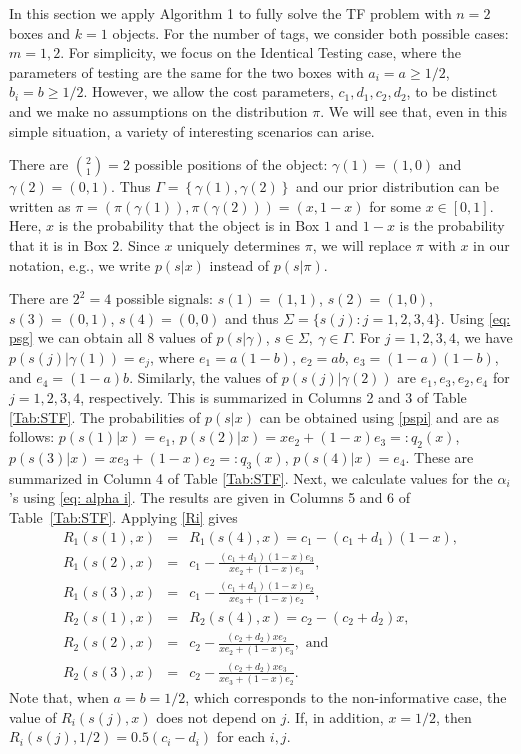 \documentclass[a4paper,11pt]{article}
\begin{document}
In this section we apply Algorithm 1 to fully solve the TF problem with $n=2$ boxes and $k=1$ objects. For the number of tags, we consider both possible cases: $m=1,2$.  For simplicity, we focus on the Identical Testing case, where the parameters of testing are the same for the two boxes with $a_i=a\ge1/2$, $b_i=b\ge1/2$. However, we allow the cost parameters, $c_1,d_1, c_2,d_2$, to be distinct and we make no assumptions on the distribution $\pi$. We will see that, even in this simple situation, a variety of interesting scenarios can arise. 

There are $\binom{2}{1}=2$ possible positions of the object: $\gamma(1)=(1,0)$ and $\gamma(2)=(0,1)$. Thus $\Gamma=\left\{\gamma(1),\gamma(2)\right\}$ and our prior distribution can be written as $\pi=( \pi(\gamma(1)),\pi(\gamma(2)) )=(x,1-x)$ for some $x\in[0,1]$. Here, $x$ is the probability that the object is in Box $1$ and $1-x$ is the probability that it is in Box $2$. Since $x$ uniquely determines $\pi$, we will replace $\pi$ with $x$ in our notation, e.g., we write $p(s|x)$ instead of $p(s|\pi)$. 

There are $2^2=4$ possible signals: $s(1)=(1,1)$, $s(2)=(1,0)$, $s(3)=(0,1)$, $s(4)=(0,0)$ and thus $\Sigma=\{s(j):j=1,2,3,4\}$. Using \eqref{eq: psg} we can obtain all $8$ values of  $p(s|\gamma)$, $s\in\Sigma,\ \gamma\in\Gamma$. For $j=1,2,3,4$, we have $p(s(j)|\gamma(1))=e_j$, where $e_1=a(1-b)$, $e_2=ab$, $e_3=(1-a)(1-b)$, and $e_4=(1-a)b$. Similarly, the values of $p(s(j)|\gamma(2))$ are $e_1, e_3, e_2, e_4$ for $j=1,2,3,4$, respectively. This is summarized in Columns 2 and 3 of Table \ref{Tab:STF}. The probabilities of $p(s|x)$ can be obtained using \eqref{pspi} and are as follows: $p(s(1)|x)=e_1$, $p(s(2)|x)= xe_2+(1-x)e_3=: q_2(x)$, $p(s(3)|x)=xe_3+(1-x)e_2=: q_3(x)$, $p(s(4)|x)=e_4$. These are summarized in Column 4 of Table  \ref{Tab:STF}. Next, we calculate values for the $\alpha_i$'s using \eqref{eq: alpha i}. The results are given in Columns 5 and 6 of Table~\ref{Tab:STF}. Applying \eqref{Ri} gives 
\begin{eqnarray*}
R_1(s(1),x)&=&R_1(s(4),x)=c_1-(c_1+d_1)(1-x), \\
R_1(s(2),x)&=&c_1-\frac{(c_1+d_1)(1-x)e_3}{xe_2+(1-x)e_3}, \\
R_1(s(3),x)&=&c_1-\frac{(c_1+d_1)(1-x)e_2}{xe_3+(1-x)e_2},\\
 R_2(s(1),x) &=&R_2(s(4),x)= c_2-(c_2+d_2)x,\\
 R_2(s(2),x)&=& c_2- \frac{(c_2+d_2)xe_2}{xe_2+(1-x)e_3},\mbox{ and }\\
 R_2(s(3),x)&=& c_2-\frac{(c_2+d_2)xe_3}{xe_3+(1-x)e_2}.
\end{eqnarray*}
Note that, when $a=b=1/2$, which corresponds to the non-informative case, the value of $R_i(s(j),x)$ does not depend on $j$. If, in addition, $x=1/2$, then $R_i(s(j),1/2) = 0.5(c_i-d_i)$ for each $i,j$. 
\end{document}
